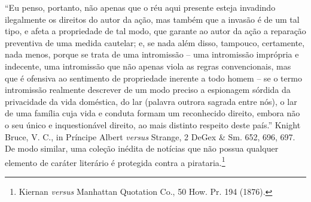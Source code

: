 {  ``Eu penso, portanto, não apenas que o réu aqui presente esteja
  invadindo ilegalmente os direitos do autor da ação, mas também que a
  invasão é de um tal tipo, e afeta a propriedade de tal modo, que
  garante ao autor da ação a reparação preventiva de uma medida
  cautelar; e, se nada além disso, tampouco, certamente, nada menos,
  porque se trata de uma intromissão -- uma intromissão imprópria e
  indecente, uma intromissão que não apenas viola as regras
  convencionais, mas que é ofensiva ao sentimento de propriedade
  inerente a todo homem -- se o termo intromissão realmente descrever de
  um modo preciso a espionagem sórdida da privacidade da vida doméstica,
  do lar (palavra outrora sagrada entre nós), o lar de uma família cuja
  vida e conduta formam um reconhecido direito, embora não o seu único e
  inquestionável direito, ao mais distinto respeito deste país.'' Knight
  Bruce, V. C., in Príncipe Albert \emph{versus} Strange, 2 DeGex \& Sm.
  652, 696, 697.} De modo similar, uma coleção inédita de notícias que
não possua qualquer elemento de caráter literário é protegida contra a
pirataria.\footnote{Kiernan \emph{versus} Manhattan Quotation Co., 50
  How. Pr. 194 (1876).}

